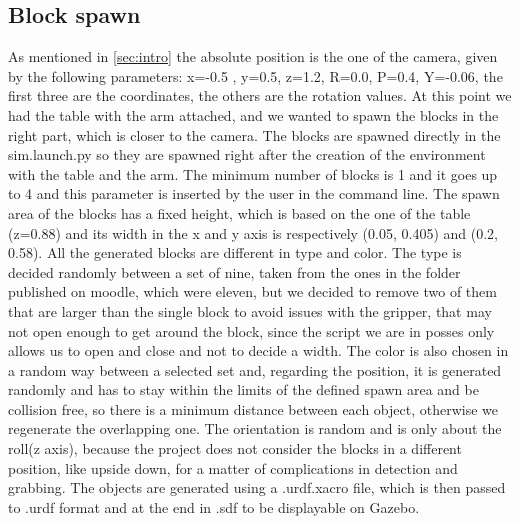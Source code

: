 \documentclass[12pt,a4paper]{article}
\begin{document}
\subsection{Block spawn}\label{subsec:blockspawn}
As mentioned in \ref{sec:intro} the absolute position is the one of the camera, given by the following parameters: x=-0.5 , y=0.5, z=1.2, R=0.0, P=0.4, Y=-0.06, the first three are the coordinates, the others are the rotation values. At this point we had the table with the arm attached, and we wanted to spawn the blocks in the right part, which is closer to the camera. The blocks are spawned directly in the sim.launch.py so they are spawned right after the creation of the environment with the table and the arm. The minimum number of blocks is 1 and it goes up to 4 and this parameter is inserted by the user in the command line. The spawn area of the blocks has a fixed height, which is based on the one of the table (z=0.88) and its width in the x and y axis is respectively (0.05, 0.405) and (0.2, 0.58). All the generated blocks are different in type and color. The type is decided randomly between a set of nine, taken from the ones in the folder published on moodle, which were eleven, but we decided to remove two of them that are larger than the single block to avoid issues with the gripper, that may not open enough to get around the block, since the script we are in posses only allows us to open and close and not to decide a width. The color is also chosen in a random way between a selected set and, regarding the position, it is generated randomly and has to stay within the limits of the defined spawn area and be collision free, so there is a minimum distance between each object, otherwise we regenerate the overlapping one. The orientation is random and is only about the roll(z axis), because the project does not consider the blocks in a different position, like upside down, for a matter of complications in detection and grabbing.
The objects are generated using a .urdf.xacro file, which is then passed to .urdf format and at the end in .sdf to be displayable on Gazebo. 
\end{document}
